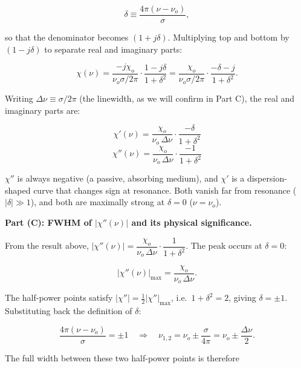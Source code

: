 \begin{equation*}
  \delta \equiv \frac{4\pi(\nu-\nu_o)}{\sigma},
\end{equation*}

so that the denominator becomes $(1 + j\delta)$. Multiplying top and bottom by $(1-j\delta)$ to separate real and imaginary parts:

\begin{equation*}
  \chi(\nu)
  = \frac{-j\chi_o}{\nu_o\sigma/2\pi}\cdot\frac{1-j\delta}{1+\delta^2}
  = \frac{\chi_o}{\nu_o\sigma/2\pi}\cdot\frac{-\delta - j}{1+\delta^2}.
\end{equation*}

Writing $\Delta\nu \equiv \sigma/2\pi$ (the linewidth, as we will confirm in Part C), the real and imaginary parts are:

\begin{equation*}
  \boxed{\chi'(\nu) = \frac{\chi_o}{\nu_o\,\Delta\nu}\cdot\frac{-\delta}{1+\delta^2}}
\end{equation*}
\begin{equation*}
  \boxed{\chi''(\nu) = \frac{\chi_o}{\nu_o\,\Delta\nu}\cdot\frac{-1}{1+\delta^2}}
\end{equation*}

$\chi''$ is always negative (a passive, absorbing medium), and $\chi'$ is a dispersion-shaped curve that changes sign at resonance. Both vanish far from resonance ($|\delta|\gg 1$), and both are maximally strong at $\delta = 0$ ($\nu = \nu_o$).

\textbf{Part (C): FWHM of $|\chi''(\nu)|$ and its physical significance.}

From the result above, $|\chi''(\nu)| = \dfrac{\chi_o}{\nu_o\,\Delta\nu}\cdot\dfrac{1}{1+\delta^2}$.
The peak occurs at $\delta = 0$:

\begin{equation*}
  |\chi''(\nu)|_{\max} = \frac{\chi_o}{\nu_o\,\Delta\nu}.
\end{equation*}

The half-power points satisfy $|\chi''| = \tfrac{1}{2}|\chi''|_{\max}$, i.e.\ $1+\delta^2 = 2$, giving $\delta = \pm 1$.
Substituting back the definition of $\delta$:

\begin{equation*}
  \frac{4\pi(\nu-\nu_o)}{\sigma} = \pm 1
  \quad\Longrightarrow\quad
  \nu_{1,2} = \nu_o \pm \frac{\sigma}{4\pi} = \nu_o \pm \frac{\Delta\nu}{2}.
\end{equation*}

The full width between these two half-power points is therefore

